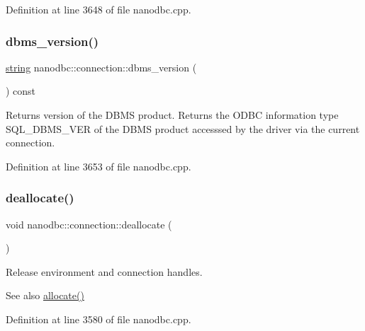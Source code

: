 Definition at line 3648 of file nanodbc.\+cpp.

\mbox{\label{classnanodbc_1_1connection_ad1d7d8901d376a3d451a49220e2c2b3c}} 
\subsubsection{\texorpdfstring{dbms\_version()}{dbms\_version()}}
{\footnotesize\ttfamily \mbox{\hyperlink{namespacenanodbc_abfc0ece56278e590911ec8352774c212}{string}} nanodbc\+::connection\+::dbms\+\_\+version (\begin{DoxyParamCaption}{ }\end{DoxyParamCaption}) const}



Returns version of the D\+B\+MS product. Returns the O\+D\+BC information type S\+Q\+L\+\_\+\+D\+B\+M\+S\+\_\+\+V\+ER of the D\+B\+MS product accesssed by the driver via the current connection. 



Definition at line 3653 of file nanodbc.\+cpp.

\mbox{\label{classnanodbc_1_1connection_a625a5575d144f49f75b0e637bf297fad}} 
\subsubsection{\texorpdfstring{deallocate()}{deallocate()}}
{\footnotesize\ttfamily void nanodbc\+::connection\+::deallocate (\begin{DoxyParamCaption}{ }\end{DoxyParamCaption})}



Release environment and connection handles. 

\begin{DoxySeeAlso}{See also}
\mbox{\hyperlink{classnanodbc_1_1connection_abbb4205d3062eb487b71aeaa59d7d398}{allocate()}} 
\end{DoxySeeAlso}


Definition at line 3580 of file nanodbc.\+cpp.

\mbox{\label{classnanodbc_1_1connection_adf614b7fdc08596122ca12e21a61ba34}} 
